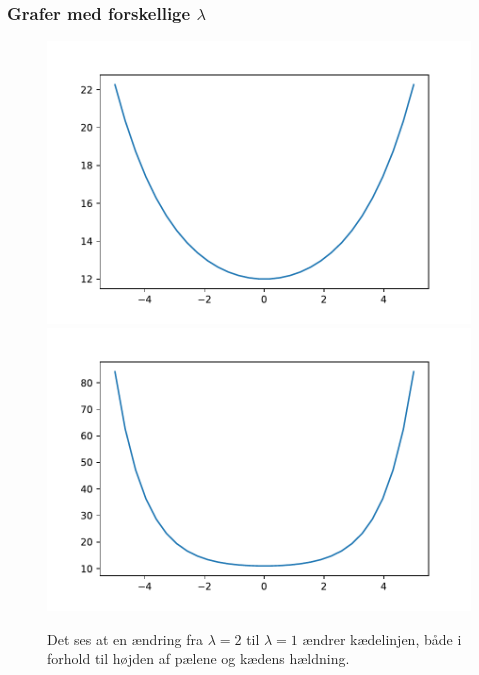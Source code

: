 \begin{frame}
\frametitle{Grafer med forskellige $\lambda$}

\begin{figure}[h!]
\includegraphics[scale=0.3]{img/fig3}
\includegraphics[scale=0.3]{img/fig4}
\caption{Det ses at en ændring fra $\lambda=2$ til $\lambda=1$ ændrer kædelinjen, både i forhold til højden af pælene og kædens hældning.}
\end{figure}
%

\end{frame}




